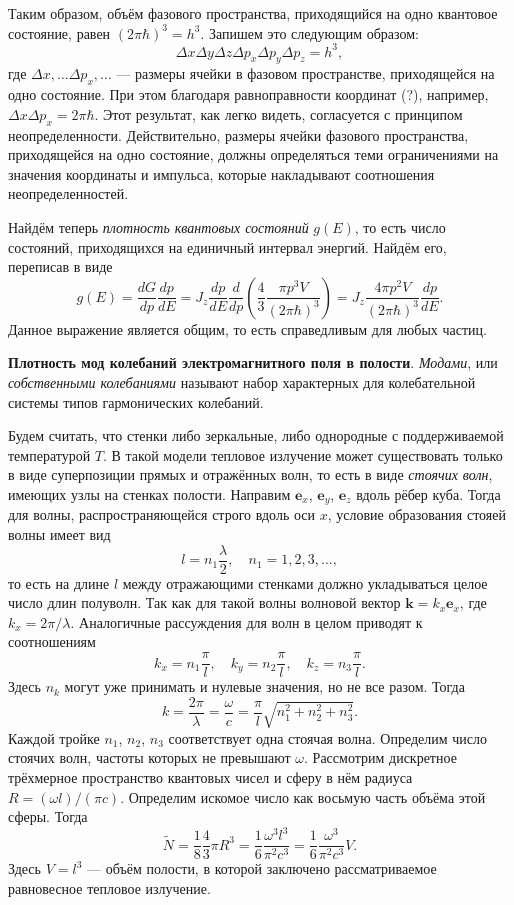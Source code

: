 Таким образом, объём фазового пространства, приходящийся на одно квантовое
состояние, равен $ (2\pi\hbar)^3 = h^3 $. Запишем это следующим образом: 
\[
  \Delta x \Delta y \Delta z \Delta p_x \Delta p_y \Delta p_z = h^3,
\]
где $ \Delta x, \ldots \Delta p_x, \ldots $ --- размеры ячейки в фазовом пространстве, приходящейся
на одно состояние. При этом благодаря равноправности координат (?), например, $
\Delta x \Delta
p_x = 2\pi \hbar$. Этот результат, как легко видеть, согласуется с принципом 
неопределенности. Действительно, размеры ячейки фазового 
пространства, приходящейся на одно состояние, должны определяться
теми ограничениями на значения координаты и импульса, которые
накладывают соотношения неопределенностей.

Найдём теперь \emph{плотность квантовых состояний} $ g(E) $, то есть число
состояний, приходящихся на единичный интервал энергий. Найдём его, переписав в
виде 
\[
  g(E)  = \frac{dG}{dp} \frac{dp}{dE} = J_z \frac{dp}{dE} \frac{d}{dp} \left(
  \frac{4}{3} \frac{\pi p^3 V}{(2\pi \hbar)^3}\right) = J_z \frac{4\pi p^2
  V}{(2\pi\hbar)^3} \frac{dp}{dE}.
\]
Данное выражение является общим, то есть справедливым для любых частиц.

\textbf{Плотность мод колебаний электромагнитного поля в полости}.
\emph{Модами}, или \emph{собственными колебаниями} называют набор характерных
для колебательной системы типов гармонических колебаний. 

Будем считать, что стенки либо зеркальные, либо однородные с поддерживаемой
температурой $ T $. В такой модели тепловое излучение может существовать только
в виде суперпозиции прямых и отражённых волн, то есть в виде \emph{стоячих
волн}, имеющих узлы на стенках полости. Направим $ \mathbf e_x $, $ \mathbf e_y
$, $ \mathbf e_z $ вдоль рёбер куба. Тогда для волны, распространяющейся строго
вдоль оси $ x $, условие образования стояей волны имеет вид 
\[
    l = n_1 \frac{\lambda}{2}, \quad n_1 = 1, 2, 3, \ldots,
\]
то есть на длине $ l $ между отражающими стенками должно укладываться целое
число длин полуволн. Так как для такой волны волновой вектор $ \mathbf k = k_x
\mathbf e_x $, где $ k_x = 2\pi/\lambda $. Аналогичные рассуждения для волн в
целом приводят к соотношениям  
\[
    k_x = n_1 \frac{\pi}{l}, \quad k_y = n_2 \frac{\pi}{l}, \quad k_z = n_3
    \frac{\pi}{l}.
\]
Здесь $ n_k $ могут уже принимать и нулевые значения, но не все разом. Тогда  
\[
  k = \frac{2\pi}{\lambda} = \frac{\omega}{c} = \frac{\pi}{l} \sqrt{n_1^2 + n_2^2 + n_3^2}.
\]
Каждой тройке $ n_1 $, $ n_2 $, $ n_3 $ соответствует одна стоячая волна.
Определим число стоячих волн, частоты которых не превышают $ \omega $.
Рассмотрим дискретное трёхмерное пространство квантовых чисел и сферу в нём
радиуса $ R = (\omega l)/(\pi c) $. Определим искомое число как восьмую часть
объёма этой сферы. Тогда  
\[
    \tilde N = \frac{1}{8} \frac{4}{3} \pi R^3 = \frac{1}{6}
    \frac{\omega^3l^3}{\pi^2 c^3} = \frac{1}{6} \frac{\omega^3}{\pi^2 c^3} V.
\]
Здесь $ V = l^3 $ --- объём полости, в которой заключено рассматриваемое
равновесное тепловое излучение.

